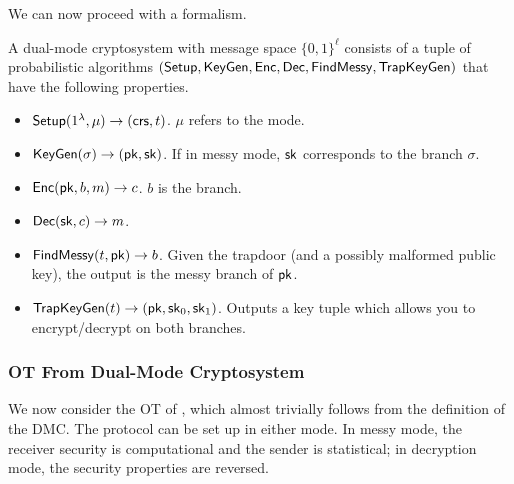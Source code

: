 We can now proceed with a formalism.

\begin{definition}
	A \rarrow dual-mode cryptosystem with message space $\{0,1\}^\ell$ consists of a tuple of probabilistic algorithms $(\mathsf{Setup},\mathsf{KeyGen}, \mathsf{Enc}, \mathsf{Dec},\\ \mathsf{FindMessy},\mathsf{TrapKeyGen})$ that have the following properties.
	\begin{itemize}
		\item $\mathsf{Setup}(1^\lambda, \mu)\rightarrow (\mathsf{crs}, t)$. $\mu$ refers to the mode.
		\item $\mathsf{KeyGen}(\sigma)\rightarrow(\mathsf{pk},\mathsf{sk})$. If in messy mode, $\mathsf{sk}$ corresponds to the branch $\sigma$.
		\item $\mathsf{Enc}(\mathsf{pk},b,m)\rightarrow c$. $b$ is the branch.
		\item $\mathsf{Dec}(\mathsf{sk}, c)\rightarrow m$.
		\item $\mathsf{FindMessy}(t,\mathsf{pk})\rightarrow b$. Given the trapdoor (and a possibly malformed public key), the output is the messy branch of $\mathsf{pk}$.
		\item $\mathsf{TrapKeyGen}(t)\rightarrow(\mathsf{pk},\mathsf{sk}_0,\mathsf{sk}_1)$. Outputs a key tuple which allows you to encrypt/decrypt on both branches.
	\end{itemize}
\end{definition}

\subsubsection{OT From Dual-Mode Cryptosystem}

We now consider the OT of \cite{dualmode}, which almost trivially follows from the definition of the DMC. The protocol can be set up in either mode. In messy mode, the receiver security is computational and the sender is statistical; in decryption mode, the security properties are reversed.

